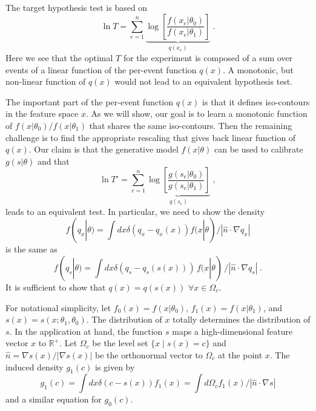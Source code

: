 \documentclass[11pt, oneside]{article}   	%
\begin{document}
 The target hypothesis test is based on 
\begin{equation}
\ln T =   \sum_{e=1}^n \underbrace{\log \left[ \frac {f(x_e | \theta_0) }{ f(x_e | \theta_1) } \right]}_{q(x_e)} \;.
\end{equation}
Here we see that the optimal $T$ for the experiment is composed of a sum over events of a  linear function of the per-event function $q(x)$. A monotonic, but non-linear function of $q(x)$ would not lead to an equivalent hypothesis test. 

The important part of the per-event function $q(x)$ is that it defines iso-contours in the feature space $x$. As we will show, our goal is to learn a monotonic function of $f(x|\theta_0)/f(x|\theta_1)$ that shares the same iso-contours. Then the remaining challenge is to find the appropriate rescaling that gives back  linear function of $q(x)$. Our claim is that the generative model $f(x|\theta)$ can be used to calibrate $g(s|\theta)$ and that
\begin{equation}
\ln T' = \sum_{e=1}^n \underbrace{\log \left[ \frac {g(s_e | \theta_0) }{ g(s_e | \theta_1) } \right]}_{q(s_e)} \;,
\end{equation}
leads to an equivalent test. In particular, we need to show the density
\begin{equation}
f(q_x|\theta) = \int dx \delta(q_x-q_x(x)) f(x|\theta)  / | \hat{n} \cdot \nabla q_x  | 
\end{equation}
is the same as
\begin{equation}
f(q_s|\theta) = \int dx \delta(q_s-q_s(s(x))) \, f(x|\theta) \, / | \hat{n} \cdot \nabla q_s  | \; .
\end{equation}
It is sufficient to show that $q(x) = q(s(x))$ $ \forall x\in\Omega_c$.


For notational simplicity, let $f_0(x) = f(x|\theta_0)$, $f_1(x) = f(x|\theta_1)$, and $s(x)=s(x; \theta_1, \theta_0)$.
The distribution of $x$ totally determines the distribution of $s$. 
In the application at hand, the function $s$ maps a high-dimensional feature vector $x$ to $\mathbb{R}^+$.
Let $\Omega_{c}$ be the level set $\{x \mid s(x) = c \}$ and $\hat{n}=\nabla s(x) / |\nabla s(x)|$ be the orthonormal vector to $\Omega_c$ at the point $x$. The induced density $g_1(c)$ is given by 
\begin{equation}
g_1(c) = \int dx \delta(c-s(x)) f_1(x) = \int d\Omega_c f_1(x)  / | \hat{n} \cdot \nabla s  |
\end{equation}
and a similar equation for $g_0(c)$. 
\end{document}
